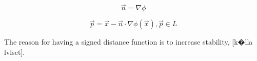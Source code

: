 \begin{equation}
\label{eq:normal2}
 \vec{n} = \nabla \phi
\end{equation} 

\begin{equation}
\label{eq:find_point}
 \vec{p} = \vec{x} - \vec{n} \cdot \nabla\phi(\vec{x}), \vec{p} \in L
\end{equation} 

The reason for having a signed distance function is to increase stability, [k�lla lvlset]. 